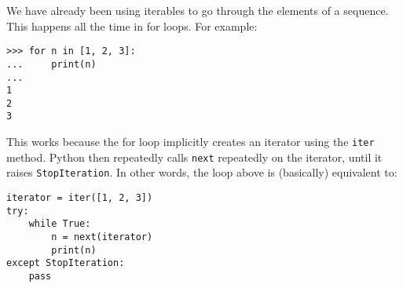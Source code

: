 We have already been using iterables to go through the elements of a sequence.
This happens all the time in for loops. For example:
\begin{lstlisting}
>>> for n in [1, 2, 3]:
...     print(n)
...
1
2
3
\end{lstlisting}

This works because the for loop implicitly creates an iterator using the
\lstinline$iter$ method. Python then repeatedly calls \lstinline$next$
repeatedly on the iterator, until it raises \texttt{StopIteration}. In other
words, the loop above is (basically) equivalent to:

\begin{blocksection}
\begin{lstlisting}
iterator = iter([1, 2, 3])
try:
    while True:
        n = next(iterator)
        print(n)
except StopIteration:
    pass
\end{lstlisting}
\end{blocksection}
